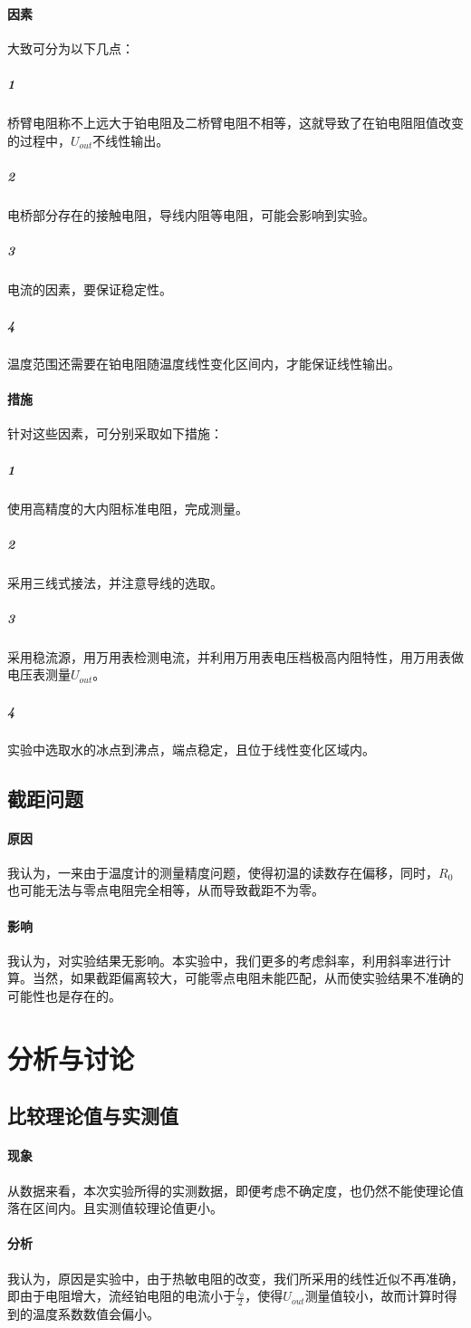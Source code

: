 \documentclass{ctexart}
\begin{document}
\paragraph{因素}大致可分为以下几点：
\subparagraph{1}桥臂电阻称不上远大于铂电阻及二桥臂电阻不相等，这就导致了在铂电阻阻值改变的过程中，$U_{out}$不线性输出。
\subparagraph{2}电桥部分存在的接触电阻，导线内阻等电阻，可能会影响到实验。
\subparagraph{3}电流的因素，要保证稳定性。
\subparagraph{4}温度范围还需要在铂电阻随温度线性变化区间内，才能保证线性输出。
\paragraph{措施}针对这些因素，可分别采取如下措施：
\subparagraph{1}使用高精度的大内阻标准电阻，完成测量。
\subparagraph{2}采用三线式接法，并注意导线的选取。
\subparagraph{3}采用稳流源，用万用表检测电流，并利用万用表电压档极高内阻特性，用万用表做电压表测量$U_{out}$。
\subparagraph{4}实验中选取水的冰点到沸点，端点稳定，且位于线性变化区域内。
\subsection{截距问题}
\paragraph{原因}我认为，一来由于温度计的测量精度问题，使得初温的读数存在偏移，同时，$R_0$也可能无法与零点电阻完全相等，从而导致截距不为零。
\paragraph{影响}我认为，对实验结果无影响。本实验中，我们更多的考虑斜率，利用斜率进行计算。当然，如果截距偏离较大，可能零点电阻未能匹配，从而使实验结果不准确的可能性也是存在的。
\section{分析与讨论}
\subsection{比较理论值与实测值}
\paragraph{现象}从数据来看，本次实验所得的实测数据，即便考虑不确定度，也仍然不能使理论值落在区间内。且实测值较理论值更小。

\paragraph{分析}我认为，原因是实验中，由于热敏电阻的改变，我们所采用的线性近似不再准确，即由于电阻增大，流经铂电阻的电流小于$\frac{I_0}{2}$，使得$U_{out}$测量值较小，故而计算时得到的温度系数数值会偏小。
\end{document}
